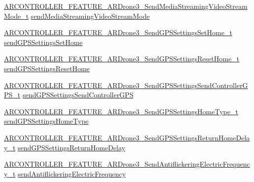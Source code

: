 \begin{DoxyCompactItemize}
\hyperlink{_a_r_c_o_n_t_r_o_l_l_e_r___feature_8h_aaeb9754075bcd5576c5562edf6753fc4}{A\+R\+C\+O\+N\+T\+R\+O\+L\+L\+E\+R\+\_\+\+F\+E\+A\+T\+U\+R\+E\+\_\+\+A\+R\+Drone3\+\_\+\+Send\+Media\+Streaming\+Video\+Stream\+Mode\+\_\+t} \hyperlink{struct_a_r_c_o_n_t_r_o_l_l_e_r___f_e_a_t_u_r_e___a_r_drone3__t_a4155dda17ba7bea3ffbb0b0771953eb6}{send\+Media\+Streaming\+Video\+Stream\+Mode}
\item 
\hyperlink{_a_r_c_o_n_t_r_o_l_l_e_r___feature_8h_a58129554a84f99739e3dbdeb33865c87}{A\+R\+C\+O\+N\+T\+R\+O\+L\+L\+E\+R\+\_\+\+F\+E\+A\+T\+U\+R\+E\+\_\+\+A\+R\+Drone3\+\_\+\+Send\+G\+P\+S\+Settings\+Set\+Home\+\_\+t} \hyperlink{struct_a_r_c_o_n_t_r_o_l_l_e_r___f_e_a_t_u_r_e___a_r_drone3__t_ad453015e6b90e2b4ea19103f3b993a4e}{send\+G\+P\+S\+Settings\+Set\+Home}
\item 
\hyperlink{_a_r_c_o_n_t_r_o_l_l_e_r___feature_8h_a20d48b6ddf4145d751d98c15a80844aa}{A\+R\+C\+O\+N\+T\+R\+O\+L\+L\+E\+R\+\_\+\+F\+E\+A\+T\+U\+R\+E\+\_\+\+A\+R\+Drone3\+\_\+\+Send\+G\+P\+S\+Settings\+Reset\+Home\+\_\+t} \hyperlink{struct_a_r_c_o_n_t_r_o_l_l_e_r___f_e_a_t_u_r_e___a_r_drone3__t_aaac983177ba2619d107f64261487e53f}{send\+G\+P\+S\+Settings\+Reset\+Home}
\item 
\hyperlink{_a_r_c_o_n_t_r_o_l_l_e_r___feature_8h_af678b1d0abc4d3b7497ee79e2fbc1fa3}{A\+R\+C\+O\+N\+T\+R\+O\+L\+L\+E\+R\+\_\+\+F\+E\+A\+T\+U\+R\+E\+\_\+\+A\+R\+Drone3\+\_\+\+Send\+G\+P\+S\+Settings\+Send\+Controller\+G\+P\+S\+\_\+t} \hyperlink{struct_a_r_c_o_n_t_r_o_l_l_e_r___f_e_a_t_u_r_e___a_r_drone3__t_a9860ffc47ac58a618f9e4b81eaa07c28}{send\+G\+P\+S\+Settings\+Send\+Controller\+G\+PS}
\item 
\hyperlink{_a_r_c_o_n_t_r_o_l_l_e_r___feature_8h_a84491767feb75b96acdf4f1f6969fb88}{A\+R\+C\+O\+N\+T\+R\+O\+L\+L\+E\+R\+\_\+\+F\+E\+A\+T\+U\+R\+E\+\_\+\+A\+R\+Drone3\+\_\+\+Send\+G\+P\+S\+Settings\+Home\+Type\+\_\+t} \hyperlink{struct_a_r_c_o_n_t_r_o_l_l_e_r___f_e_a_t_u_r_e___a_r_drone3__t_ac76004cda57e2d2eaf2684af890f61e2}{send\+G\+P\+S\+Settings\+Home\+Type}
\item 
\hyperlink{_a_r_c_o_n_t_r_o_l_l_e_r___feature_8h_a0ac76750630d9b61758f28292472bca4}{A\+R\+C\+O\+N\+T\+R\+O\+L\+L\+E\+R\+\_\+\+F\+E\+A\+T\+U\+R\+E\+\_\+\+A\+R\+Drone3\+\_\+\+Send\+G\+P\+S\+Settings\+Return\+Home\+Delay\+\_\+t} \hyperlink{struct_a_r_c_o_n_t_r_o_l_l_e_r___f_e_a_t_u_r_e___a_r_drone3__t_a239c3e9bb03596785c16cb6dd9c65a09}{send\+G\+P\+S\+Settings\+Return\+Home\+Delay}
\item 
\hyperlink{_a_r_c_o_n_t_r_o_l_l_e_r___feature_8h_aaba6ddd5ccc158c389986688ac87d993}{A\+R\+C\+O\+N\+T\+R\+O\+L\+L\+E\+R\+\_\+\+F\+E\+A\+T\+U\+R\+E\+\_\+\+A\+R\+Drone3\+\_\+\+Send\+Antiflickering\+Electric\+Frequency\+\_\+t} \hyperlink{struct_a_r_c_o_n_t_r_o_l_l_e_r___f_e_a_t_u_r_e___a_r_drone3__t_a6add15511390f83d22771426cf85718f}{send\+Antiflickering\+Electric\+Frequency}

\end{DoxyCompactItemize}
